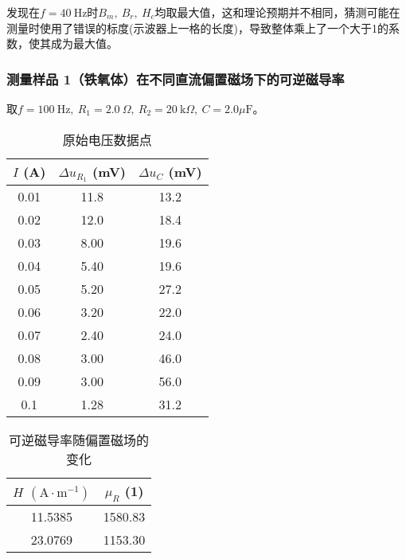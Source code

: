 \documentclass[11pt]{article}
\begin{document}
	发现在$f=40\ \mathrm{Hz}$时$B_m,\ B_r,\ H_c$均取最大值，这和理论预期并不相同，猜测可能在测量时使用了错误的标度(示波器上一格的长度)，导致整体乘上了一个大于1的系数，使其成为最大值。
	
	
	
	
	\subsubsection{测量样品 1（铁氧体）在不同直流偏置磁场下的可逆磁导率}
	取$f=100\ \mathrm{Hz}, \ R_1=2.0\ \Omega , \ R_2=20\ \mathrm{k}\Omega ,\ C=2.0\mu \mathrm{F}$。
	
	\begin{center}
		\noindent\begin{minipage}{0.35\columnwidth}
			\begin{table}[H]\centering
				\caption{原始电压数据点}
				\label{1.4电压}
				\begin{tabular}{ccc} \toprule \( I \) (A) & \( \Delta u_{R_1} \) (mV) & \( \Delta u_C \) (mV) \\ \midrule 0.01 & 11.8 & 13.2 \\ 0.02 & 12.0 & 18.4 \\ 0.03 & 8.00 & 19.6 \\ 0.04 & 5.40 & 19.6 \\ 0.05 & 5.20 & 27.2 \\ 0.06 & 3.20 & 22.0 \\ 0.07 & 2.40 & 24.0 \\ 0.08 & 3.00 & 46.0 \\ 0.09 & 3.00 & 56.0 \\ 0.1 & 1.28 & 31.2 \\ \bottomrule \end{tabular}
			\end{table}
		\end{minipage}\begin{minipage}{0.35\columnwidth}
			\begin{table}[H]\centering
				\caption{可逆磁导率随偏置磁场的变化}
				\label{1.4换算后}
				\begin{tabular}{cc}\toprule
					$H$ $\mathrm{(A\cdot m^{-1})}$ & $\mu_R$ (1) \\
					\midrule
					11.5385 & 1580.83 \\
					23.0769 & 1153.30 \\

\end{tabular}
\end{table}
\end{minipage}
\end{center}
\end{document}

